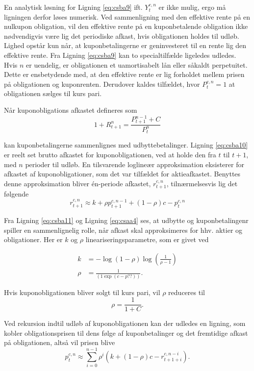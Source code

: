 \documentclass[
  a4paper,
  oneside]{memoir}
\begin{document}
En analytisk løsning for Ligning \eqref{eq:csba9} ift. \(Y_t^{c,n}\) er ikke mulig, ergo må ligningen derfor løses numerisk. Ved sammenligning med den effektive rente på en nulkupon obligation, vil den effektive rente på en kuponbetalende obligation ikke nødvendigvis være lig det periodiske afkast, hvis obligationen holdes til udløb. Lighed opstår kun når, at kuponbetalingerne er geninvesteret til en rente lig den effektive rente. Fra Ligning \eqref{eq:csba9} kan to specialtilfælde ligeledes udledes. Hvis \(n\) er uendelig, er obligationen et uamortisabelt lån eller såkaldt perpetuitet. Dette er ensbetydende med, at den effektive rente er lig forholdet mellem prisen på obligationen og kuponrenten. Derudover kaldes tilfældet, hvor \(P_t^{c,n}=1\) at obligationen sælges til kurs pari.

Når kuponobligations afkastet defineres som
\begin{equation}
1+R_{t+1}^n = \frac{P_{t+1}^{n-1}+C}{P_t^n} \label{eq:csba10}
\end{equation}

kan kuponbetalingerne sammenlignes med udbyttebetalinger. Ligning \eqref{eq:csba10} er reelt set brutto afkastet for kuponobligationen, ved at holde den fra \(t\) til \(t+1\), med \(n\) perioder til udløb. En tilsvarende loglineær approksimation eksisterer for afkastet af kuponobligationer, som det var tilfældet for aktieafkastet. Benyttes denne approksimation bliver én-periode afkastet, \(r_{t+1}^{c,n}\), tilnærmelsesvis lig det følgende
\begin{equation}
r_{t+1}^{c,n}\approx k + \rho p_{t+1}^{c,n-1} + (1-\rho)c - p_t^{c,n} \label{eq:csba11}
\end{equation}

Fra Ligning \eqref{eq:csba11} og Ligning \eqref{eq:csaa4} ses, at udbytte og kuponbetalingenr spiller en sammenlignelig rolle, når afkast skal approksimeres for hhv. aktier og obligationer. Her er \(k\) og \(\rho\) lineariseringsparametre, som er givet ved

\begin{align*}
k &= -\log(1-\rho)\log(\frac{1}{\rho-1})\\
\rho&= \frac{1}{(1\exp(c-p??))}.
\end{align*}

Hvis kuponobligationen bliver solgt til kurs pari, vil \(\rho\) reduceres til
\[\rho=\frac{1}{1+C}.\]

Ved rekursion indtil udløb af kuponobligationen kan der udledes en ligning, som kobler obligationsprisen til dens følge af kuponbetalinger og det fremtidige afkast på obligationen, altså vil prisen blive
\begin{equation}
p_t^{c,n}\approx\sum_{i=0}^{n-1} \rho^i (k+(1-\rho)c - r_{t+1+i}^{c,n-i}). \label{eq:csba12}
\end{equation}
\end{document}
